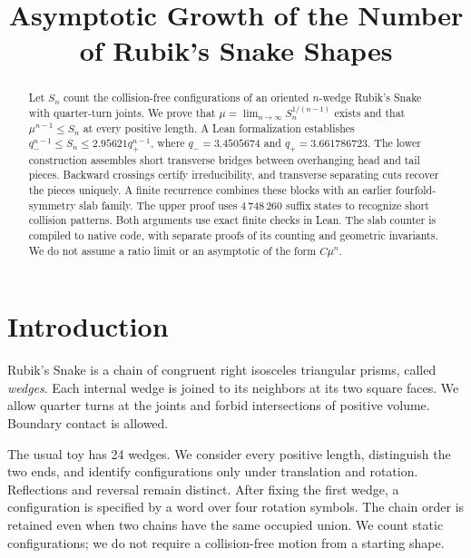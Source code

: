 \documentclass[conference]{IEEEtran}
\begin{document}
\title{Asymptotic Growth of the Number of Rubik's Snake Shapes}
\author{
}
\maketitle

\begin{abstract}
Let $S_n$ count the collision-free configurations of an oriented
$n$-wedge Rubik's Snake with quarter-turn joints. We prove that
$\mu=\lim_{n\to\infty}S_n^{1/(n-1)}$ exists and that
$\mu^{n-1}\leq S_n$ at every positive length.
A Lean formalization establishes
$q_-^{n-1}\leq S_n\leq2.95621q_+^{n-1}$, where
$q_-=3.4505674$ and $q_+=3.661786723$.
The lower construction assembles short transverse bridges between
overhanging head and tail pieces. Backward crossings certify
irreducibility, and transverse separating cuts recover the pieces
uniquely. A finite recurrence combines these blocks with an earlier
fourfold-symmetry slab family.
The upper proof uses $4\,748\,260$ suffix states to recognize short
collision patterns. Both arguments use exact finite checks in Lean.
The slab counter is compiled to native code, with separate proofs of
its counting and geometric invariants.
We do not assume a ratio limit or an asymptotic of the form $C\mu^n$.
\end{abstract}

\section{Introduction}

Rubik's Snake is a chain of congruent right isosceles triangular
prisms, called \emph{wedges}. Each internal wedge is joined to its
neighbors at its two square faces. We allow quarter turns at the
joints and forbid intersections of positive volume. Boundary contact
is allowed.

The usual toy has 24 wedges. We consider every positive length,
distinguish the two ends, and identify configurations only under
translation and rotation. Reflections and reversal remain distinct.
After fixing the first wedge, a configuration is specified by a word
over four rotation symbols. The chain order is retained even when
two chains have the same occupied union. We count static configurations;
we do not require a collision-free motion from a starting shape.
\end{document}
